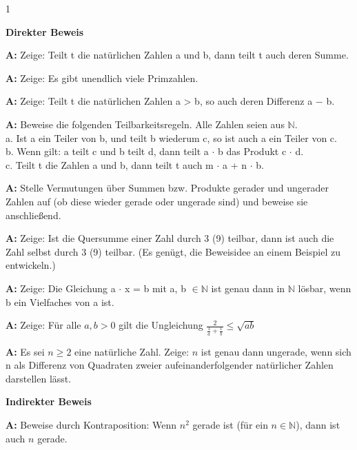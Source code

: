 \documentclass[landscape,twocolumn,a4paper]{article}
\begin{document}
\newcommand\x{1}
\setcounter {y} {1}

\parindent 0mm

\textbf{Direkter Beweis}
\bigskip

\textbf{A:} Zeige: Teilt t die natürlichen Zahlen a und b, dann teilt t auch deren Summe.
\bigskip {}
 
\textbf{A:} Zeige: Es gibt unendlich viele Primzahlen.
\bigskip {}

\textbf{A:} Zeige: Teilt t die natürlichen Zahlen a > b, so auch deren Differenz a − b.
\bigskip {}

\textbf{A:} Beweise die folgenden Teilbarkeitsregeln. Alle Zahlen seien aus $\mathbb{N}$. \\
a. Ist a ein Teiler von b, und teilt b wiederum c, so ist auch a ein Teiler von c. \\
b. Wenn gilt: a teilt c und b teilt d, dann teilt a $\cdot$ b das Produkt c $\cdot$ d. \\
c. Teilt t die Zahlen a und b, dann teilt t auch m $\cdot$ a + n $\cdot$ b.
\bigskip {}

\textbf{A:} Stelle Vermutungen über Summen bzw. Produkte gerader und ungerader Zahlen auf (ob
diese wieder gerade oder ungerade sind) und beweise sie anschließend.
\bigskip {}

\textbf{A:} Zeige: Ist die Quersumme einer Zahl durch 3 (9) teilbar, dann
ist auch die Zahl selbst durch 3 (9) teilbar. (Es genügt, die Beweisidee an einem
Beispiel zu entwickeln.)
\bigskip {}

\textbf{A:} Zeige: Die Gleichung a $\cdot$ x = b mit a, b $\in \mathbb{N}$ ist genau dann in $\mathbb{N}$
lösbar, wenn b ein Vielfaches von a ist.
\bigskip {}

\textbf{A:} Zeige: Für alle $a,b > 0$ gilt die Ungleichung $\frac{2}{\frac{1}{a}+\frac{1}{b}} \le \sqrt{ab}$
\bigskip {}

\textbf{A:} Es sei $n \ge 2$ eine natürliche Zahl. Zeige: $n$ ist genau dann ungerade,
wenn sich n als Differenz von Quadraten zweier aufeinanderfolgender natürlicher Zahlen darstellen lässt.
\bigskip {}

\textbf{Indirekter Beweis}
\bigskip

\textbf{A:} Beweise durch Kontraposition: Wenn $n^2$ gerade ist (für ein $n \in \mathbb{N}$), dann ist auch $n$ gerade.
\bigskip {}
\end{document}
